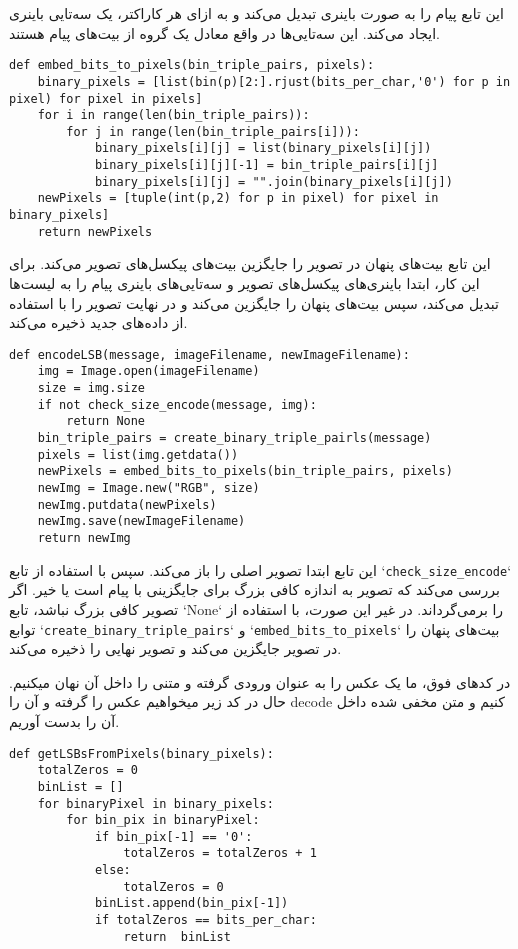 این تابع پیام را به صورت باینری تبدیل می‌کند و به ازای هر کاراکتر، یک سه‌تایی باینری ایجاد می‌کند. این سه‌تایی‌ها در واقع معادل یک گروه از بیت‌های پیام هستند.

\begin{lstlisting}[caption={Python code}]
def embed_bits_to_pixels(bin_triple_pairs, pixels):
    binary_pixels = [list(bin(p)[2:].rjust(bits_per_char,'0') for p in pixel) for pixel in pixels]
    for i in range(len(bin_triple_pairs)):
        for j in range(len(bin_triple_pairs[i])):
            binary_pixels[i][j] = list(binary_pixels[i][j])
            binary_pixels[i][j][-1] = bin_triple_pairs[i][j]
            binary_pixels[i][j] = "".join(binary_pixels[i][j])
    newPixels = [tuple(int(p,2) for p in pixel) for pixel in binary_pixels]
    return newPixels
\end{lstlisting}

این تابع بیت‌های پنهان در تصویر را جایگزین بیت‌های پیکسل‌های تصویر می‌کند. برای این کار، ابتدا باینری‌های پیکسل‌های تصویر و سه‌تایی‌های باینری پیام را به لیست‌ها تبدیل می‌کند، سپس بیت‌های پنهان را جایگزین می‌کند و در نهایت تصویر را با استفاده از داده‌های جدید ذخیره می‌کند.

\begin{lstlisting}[caption={Python code}]
def encodeLSB(message, imageFilename, newImageFilename):
    img = Image.open(imageFilename)
    size = img.size
    if not check_size_encode(message, img):
        return None
    bin_triple_pairs = create_binary_triple_pairls(message)
    pixels = list(img.getdata())
    newPixels = embed_bits_to_pixels(bin_triple_pairs, pixels)
    newImg = Image.new("RGB", size)
    newImg.putdata(newPixels)
    newImg.save(newImageFilename)
    return newImg
\end{lstlisting}

این تابع ابتدا تصویر اصلی را باز می‌کند. سپس با استفاده از تابع `\texttt{check\_size\_encode}` بررسی می‌کند که تصویر به اندازه کافی بزرگ برای جایگزینی با پیام است یا خیر. اگر تصویر کافی بزرگ نباشد، تابع `None` را برمی‌گرداند. در غیر این صورت، با استفاده از توابع `\texttt{create\_binary\_triple\_pairs}` و `\texttt{embed\_bits\_to\_pixels}` بیت‌های پنهان را در تصویر جایگزین می‌کند و تصویر نهایی را ذخیره می‌کند.

در کدهای فوق، ما یک عکس را به عنوان ورودی گرفته و متنی را داخل آن نهان میکنیم. حال در کد زیر میخواهیم عکس را گرفته و آن را decode کنیم و متن مخفی شده داخل آن را بدست آوریم.

\begin{lstlisting}[caption={Python code}]
def getLSBsFromPixels(binary_pixels):
    totalZeros = 0
    binList = []
    for binaryPixel in binary_pixels:
        for bin_pix in binaryPixel:
            if bin_pix[-1] == '0':
                totalZeros = totalZeros + 1
            else:
                totalZeros = 0
            binList.append(bin_pix[-1])
            if totalZeros == bits_per_char:
                return  binList
\end{lstlisting}

